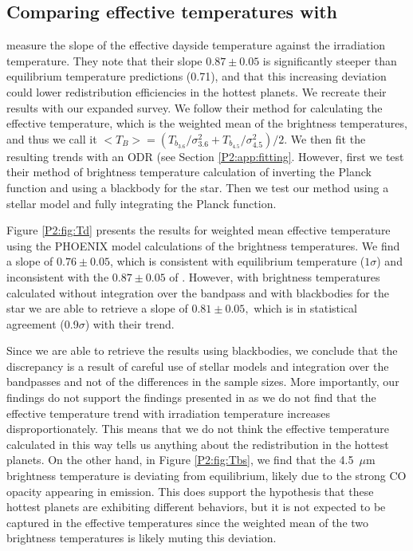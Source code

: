 \begin{subappendices}
\section{Comparing effective temperatures with \citet{Schwartz2015}}
\label{P2:app:schwartzcomparison}

\citet{Schwartz2015} measure the slope of the effective dayside temperature against the irradiation temperature. They note that their slope $0.87\pm0.05$ is significantly steeper than equilibrium temperature predictions (0.71), and that this increasing deviation could  lower redistribution efficiencies in the hottest planets. We recreate their results with our expanded survey. We follow their method for calculating the effective temperature, which is the weighted mean of the brightness temperatures, and thus we call it $<T_B> = (T_{b_{3.6}}/ \sigma_{3.6}^2 +  T_{b_{4.5}}/\sigma_{4.5}^2) / 2 $. We then fit the resulting trends with an ODR (see Section \ref{P2:app:fitting}. However, first we test their method of brightness temperature calculation of inverting the Planck function and using a blackbody for the star. Then we test our method using a stellar model and fully integrating the Planck function.

Figure \ref{P2:fig:Td} presents the results for weighted mean effective temperature using the PHOENIX model calculations of the brightness temperatures. We find a slope of $0.76\pm0.05$, which is consistent with equilibrium temperature ($1\sigma$) and inconsistent with the $0.87\pm0.05$ of \citet{Schwartz2015}. However, with brightness temperatures calculated without integration over the bandpass and with blackbodies for the star we are able to retrieve a slope of $0.81\pm0.05,$ which is in statistical agreement (0.9$\sigma$) with their trend.

Since we are able to retrieve the results using blackbodies, we conclude that the discrepancy is a result of careful use of stellar models and integration over the bandpasses and not of the differences in the sample sizes. More importantly, our findings do not support the findings presented in \citet{Schwartz2015} as we do not find that the effective temperature trend with irradiation temperature increases disproportionately. This means that we do not think the effective temperature calculated in this way tells us anything about the redistribution in the hottest planets. On the other hand, in Figure \ref{P2:fig:Tbs}, we find that the 4.5~$\mu$m brightness temperature is deviating from equilibrium, likely due to the strong CO opacity appearing in emission. This does support the hypothesis that these hottest planets are exhibiting different behaviors, but it is not expected to be captured in the effective temperatures since the weighted mean of the two brightness temperatures is likely muting this deviation.


\end{subappendices}
